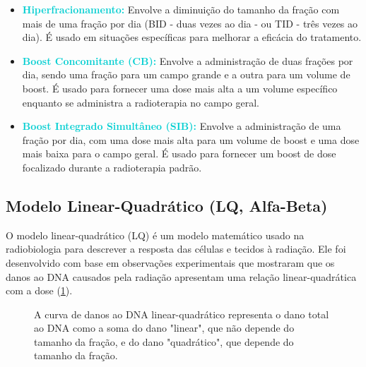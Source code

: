 \documentclass[11pt,a4paper]{article}
\begin{document}
\begin{itemize}
		\item \textcolor{DarkTurquoise}{\textbf{Hiperfracionamento:}} Envolve a diminuição do tamanho da fração com mais de uma fração por dia (BID - duas vezes ao dia - ou TID - três vezes ao dia). É usado em situações específicas para melhorar a eficácia do tratamento.

		\item \textcolor{DarkTurquoise}{\textbf{Boost Concomitante (CB):}} Envolve a administração de duas frações por dia, sendo uma fração para um campo grande e a outra para um volume de boost. É usado para fornecer uma dose mais alta a um volume específico enquanto se administra a radioterapia no campo geral.

		\item \textcolor{DarkTurquoise}{\textbf{Boost Integrado Simultâneo (SIB):}} Envolve a administração de uma fração por dia, com uma dose mais alta para um volume de boost e uma dose mais baixa para o campo geral. É usado para fornecer um boost de dose focalizado durante a radioterapia padrão.
	\end{itemize}

\subsection{Modelo Linear-Quadrático (LQ, Alfa-Beta)}

	O modelo linear-quadrático (LQ) é um modelo matemático usado na radiobiologia para descrever a resposta das células e tecidos à radiação. Ele foi desenvolvido com base em observações experimentais que mostraram que os danos ao DNA causados pela radiação apresentam uma relação linear-quadrática com a dose (\ref{fig:modeloLinearQuadratico}).

	\begin{figure}[h]
		\centering
		\caption{A curva de danos ao DNA linear-quadrático representa o dano total ao DNA como a soma do dano "linear", que não depende do tamanho da fração, e do dano "quadrático", que depende do tamanho da fração.}
		\label{fig:modeloLinearQuadratico}
	\end{figure}
\end{document}

